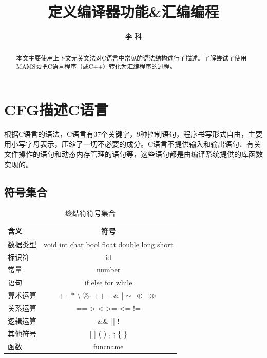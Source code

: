 \documentclass[lang=cn,11pt]{elegantpaper}
\title{定义编译器功能\&汇编编程}
\author{李  科}
\institute{学号：1711344}
\date{}
\begin{document}
\maketitle

\begin{abstract}
\noindent 本文主要使用上下文无关文法对C语言中常见的语法结构进行了描述。了解尝试了使用MAMS32把C语言程序（或C++）转化为汇编程序的过程。
\end{abstract}


\section{CFG描述C语言}
根据C语言的语法，C语言有37个关键字，9种控制语句，程序书写形式自由，主要用小写字母表示，压缩了一切不必要的成分。C语言不提供输入和输出语句、有关文件操作的语句和动态内存管理的语句等，这些语句都是由编译系统提供的库函数实现的。

\subsection{符号集合}
\begin{table}[H]
  \small
  \centering
  \caption{终结符符号集合}
    \begin{tabular}{l|c}
    \toprule
          含义          &       符号            \\
    \midrule
    数据类型          &    void int char bool float double long short      \\
    标识符           &     id         \\
    常量          &         number             \\
    语句             &         if else for while            \\
    算术运算       &    + - $\ast$ $\setminus$ \% $\hat{}$ ++ -- \& |  $\sim $ $\ll$  $\gg$      \\
    关系运算         &   == > < >= <= !=     \\
    逻辑运算            &       \&\& || !            \\
    其他符号         &     [ ] ( ) , ; \{ \}        \\
    函数        &     funcname        \\
    \end{tabular}%
\end{table}%
\end{document}
